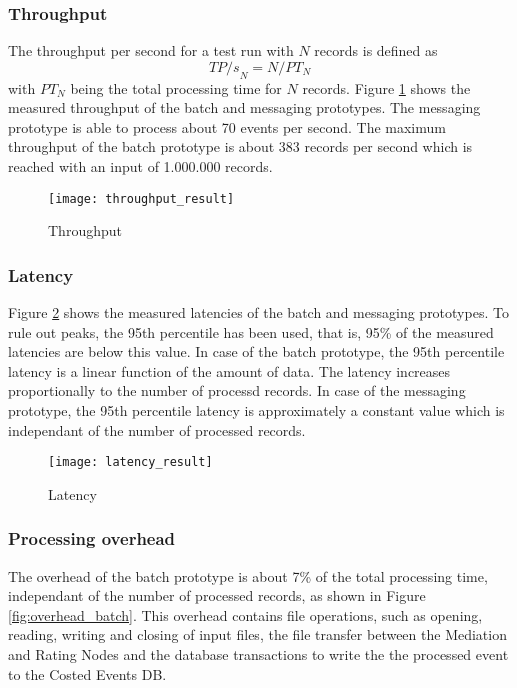 \subsubsection{Throughput}

The throughput per second for a test run with $N$ records is defined as
\begin{displaymath}
{TP/s}_N = N / PT_N
\end{displaymath}
with $PT_N$ being the total processing time for $N$ records. 
Figure \ref{fig:result_throughput} shows the measured throughput of the batch and messaging prototypes. The messaging prototype is able to process about 70 events per second. The maximum throughput of the batch prototype is about 383 records per second which is reached with an input of 1.000.000 records.

\begin{figure}[htbp]
	\centering
	\texttt{[image: throughput\_result]}
	\caption{Throughput}
	\label{fig:result_throughput}
\end{figure}

\subsubsection{Latency}\label{sec:result_latency}

Figure \ref{fig:result_latency} shows the measured latencies of the batch and messaging prototypes. To rule out peaks, the 95th percentile has been used, that is, 95\% of the measured latencies are below this value. In case of the batch prototype, the 95th percentile latency is a linear function of the amount of data. The latency increases proportionally to the number of processd records. In case of the messaging prototype, the 95th percentile latency is approximately a constant value which is independant of the number of processed records.

\begin{figure}[htbp]
	\centering
	\texttt{[image: latency\_result]}
	\caption{Latency}
	\label{fig:result_latency}
\end{figure}

\subsubsection{Processing overhead}

The overhead of the batch prototype is about 7\% of the total processing time, independant of the number of processed records, as shown in Figure \ref{fig:overhead_batch}. This overhead contains file operations, such as opening, reading, writing and closing of input files, the file transfer between the Mediation and Rating Nodes and the database transactions to write the the processed event to the Costed Events DB.


